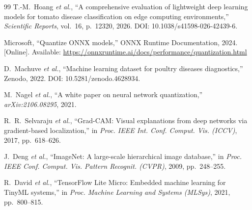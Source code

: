 \documentclass[conference,a4paper]{IEEEtran}
\begin{document}
\begin{thebibliography}{99}
T.-M.~Hoang \textit{et al.}, ``A comprehensive evaluation of lightweight deep learning models for tomato disease classification on edge computing environments,'' \emph{Scientific Reports}, vol.~16, p.~12320, 2026. DOI: 10.1038/s41598-026-42439-6.

Microsoft, ``Quantize ONNX models,'' ONNX Runtime Documentation, 2024. [Online]. Available: \url{https://onnxruntime.ai/docs/performance/quantization.html}

D.~Machuve \textit{et al.}, ``Machine learning dataset for poultry diseases diagnostics,'' Zenodo, 2022. DOI: 10.5281/zenodo.4628934.

M.~Nagel \textit{et al.}, ``A white paper on neural network quantization,'' \textit{arXiv:2106.08295}, 2021.

R.~R.~Selvaraju \textit{et al.}, ``Grad-CAM: Visual explanations from deep networks via gradient-based localization,'' in \emph{Proc. IEEE Int. Conf. Comput. Vis. (ICCV)}, 2017, pp.~618--626.

J.~Deng \textit{et al.}, ``ImageNet: A large-scale hierarchical image database,'' in \emph{Proc. IEEE Conf. Comput. Vis. Pattern Recognit. (CVPR)}, 2009, pp.~248--255.

R.~David \textit{et al.}, ``TensorFlow Lite Micro: Embedded machine learning for TinyML systems,'' in \textit{Proc. Machine Learning and Systems (MLSys)}, 2021, pp.~800--815.

\end{thebibliography}
\end{document}
